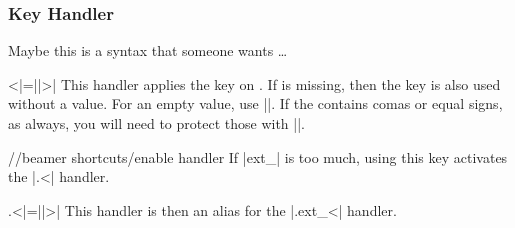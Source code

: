 \subsubsection{Key Handler}
Maybe this is a syntax that someone wants \dots
\begin{ext_handler}{{<}|=||>| }
  This handler applies the key on .
  If  is missing, then the key is also used without a value.
  For an empty value, use |{}|. If the  contains comas or equal signs,
  as always, you will need to protect those with |{}|.
  \begin{key}{/\tikzext/beamer shortcuts/enable handler}
    If |ext_| is too much, using this key activates the |.<| handler.
    \begin{handler}{{.<}|=||>| }
      This handler is then an alias for the |.ext_<| handler.
    \end{handler}
  \end{key}
\end{ext_handler}
\endinput